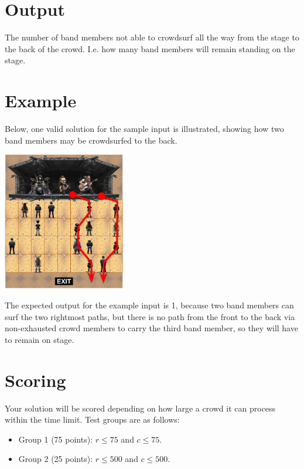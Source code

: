 \section*{Output}

The number of band members not able to crowdsurf all the way from the stage to the back of the crowd. I.e. how many band members will remain standing on the stage.

\section*{Example}

Below, one valid solution for the sample input is illustrated, showing how two band members may be crowdsurfed to the back.

\begin{center}
  \includegraphics[width=0.4\textwidth]{img/example.png}
\end{center}

The expected output for the example input is 1, because two band members can surf the two rightmost paths, but there is no path from the front to the back via non-exhausted crowd members to carry the third band member, so they will have to remain on stage.

\section*{Scoring}

Your solution will be scored depending on how large a crowd it can process within the time limit. Test groups are as follows:

\begin{itemize}
  \item Group 1 (75 points): $r \leq 75$ and $c \leq 75$.
  \item Group 2 (25 points): $r \leq 500$ and $c \leq 500$.
\end{itemize}
